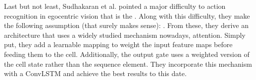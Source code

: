 \documentclass[12pt, a4paper]{report}
\begin{document}
					\par
					Last but not least, Sudhakaran et al. \cite{sudhakaran2019lsta} pointed a major difficulty to action recognition in egocentric vision that is the .
					Along with this difficulty, they make the following assumption (that surely makes sense): .
					From these, they derive an architecture that uses a widely studied mechanism nowadays, attention.
					Simply put, they add a learnable mapping to weight the input feature maps before feeding them to the cell.
					Additionally, the output gate uses a weighted version of the cell state rather than the sequence element.
					They incorporate this mechanism with a ConvLSTM and achieve the best results to this date.
\end{document}

